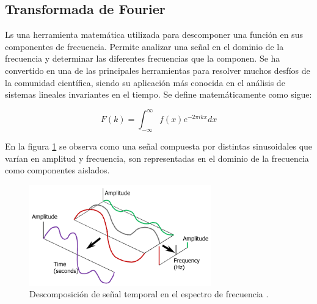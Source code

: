\subsection{Transformada de Fourier} Ls una herramienta matemática utilizada para descomponer una función en sus componentes de frecuencia. Permite analizar una señal en el dominio de la frecuencia y determinar las diferentes frecuencias que la componen. Se ha convertido en una de las principales herramientas para resolver muchos desfíos de la comunidad científica, siendo su aplicación más conocida en el análisis de sistemas lineales invariantes en el tiempo. Se define matemáticamente como sigue:

\begin{equation}
    F(k) = \int_{-\infty}^{\infty} f(x) e^{-2\pi i k x} dx
\end{equation}

En la figura \ref{fig:fourier} se observa como una señal compuesta por distintas sinusoidales que varían en amplitud y frecuencia, son representadas en el dominio de la frecuencia como componentes aislados. 

\begin{figure}[H]
    \centering
    \includegraphics[width = 0.7\textwidth]{imagenes/cap1_marcoteo/FourierTRansform.png}
    \caption{Descomposición de señal temporal en el espectro de frecuencia \citep{siemens2019}.}
    \label{fig:fourier}
\end{figure}


